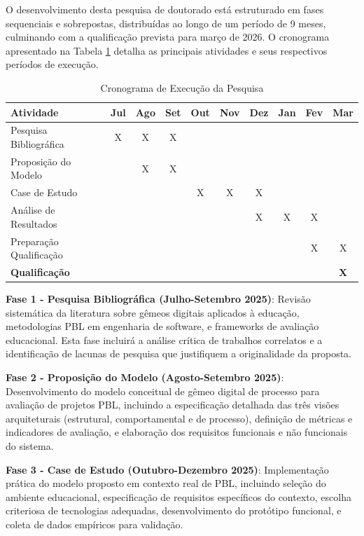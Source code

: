 \documentclass[12pt,a4paper]{article}
\begin{document}
O desenvolvimento desta pesquisa de doutorado está estruturado em fases sequenciais e sobrepostas, distribuídas ao longo de um período de 9 meses, culminando com a qualificação prevista para março de 2026. O cronograma apresentado na Tabela \ref{tab:cronograma} detalha as principais atividades e seus respectivos períodos de execução.

\begin{table}[htbp]
\centering
\caption{Cronograma de Execução da Pesquisa}
\label{tab:cronograma}
\small
\begin{tabular}{|l|c|c|c|c|c|c|c|c|c|}
\hline
\textbf{Atividade} & \textbf{Jul} & \textbf{Ago} & \textbf{Set} & \textbf{Out} & \textbf{Nov} & \textbf{Dez} & \textbf{Jan} & \textbf{Fev} & \textbf{Mar} \\
\hline
Pesquisa Bibliográfica & X & X & X & & & & & & \\
\hline
Proposição do Modelo & & X & X & & & & & & \\
\hline
Case de Estudo & & & & X & X & X & & & \\
\hline
Análise de Resultados & & & & & & X & X & X & \\
\hline
Preparação Qualificação & & & & & & & & X & X \\
\hline
\textbf{Qualificação} & & & & & & & & & \textbf{X} \\
\hline
\end{tabular}
\end{table}

\textbf{Fase 1 - Pesquisa Bibliográfica (Julho-Setembro 2025)}: Revisão sistemática da literatura sobre gêmeos digitais aplicados à educação, metodologias PBL em engenharia de software, e frameworks de avaliação educacional. Esta fase incluirá a análise crítica de trabalhos correlatos e a identificação de lacunas de pesquisa que justifiquem a originalidade da proposta.

\textbf{Fase 2 - Proposição do Modelo (Agosto-Setembro 2025)}: Desenvolvimento do modelo conceitual de gêmeo digital de processo para avaliação de projetos PBL, incluindo a especificação detalhada das três visões arquiteturais (estrutural, comportamental e de processo), definição de métricas e indicadores de avaliação, e elaboração dos requisitos funcionais e não funcionais do sistema.

\textbf{Fase 3 - Case de Estudo (Outubro-Dezembro 2025)}: Implementação prática do modelo proposto em contexto real de PBL, incluindo seleção do ambiente educacional, especificação de requisitos específicos do contexto, escolha criteriosa de tecnologias adequadas, desenvolvimento do protótipo funcional, e coleta de dados empíricos para validação.
\end{document}
